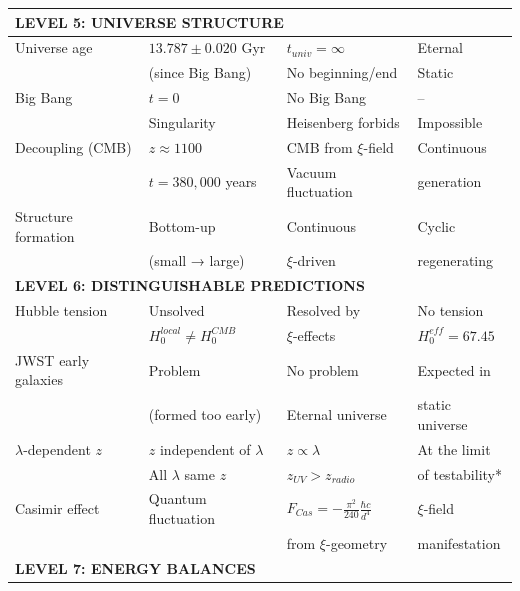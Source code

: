 \documentclass[12pt,a4paper]{report}
\begin{document}
\begin{longtable}{p{4.0cm}p{3.2cm}p{2.8cm}p{2.8cm}}
	\midrule
	\multicolumn{4}{l}{\textbf{LEVEL 5: UNIVERSE STRUCTURE}} \\
	\midrule
	
	Universe age & $13.787 \pm 0.020$ Gyr & $t_{univ} = \infty$ & Eternal \\
	& (since Big Bang) & No beginning/end & Static \\[0.3em]
	
	Big Bang & $t = 0$ & No Big Bang & -- \\
	& Singularity & Heisenberg forbids & Impossible \\[0.3em]
	
	Decoupling (CMB) & $z \approx 1100$ & CMB from $\xi$-field & Continuous \\
	& $t = 380,000$ years & Vacuum fluctuation & generation \\[0.3em]
	
	Structure formation & Bottom-up & Continuous & Cyclic \\
	& (small → large) & $\xi$-driven & regenerating \\[0.3em]
	
	\midrule
	\multicolumn{4}{l}{\textbf{LEVEL 6: DISTINGUISHABLE PREDICTIONS}} \\
	\midrule
	
	Hubble tension & Unsolved & Resolved by & No tension \\
	& $H_0^{local} \neq H_0^{CMB}$ & $\xi$-effects & $H_0^{eff} = 67.45$ \\[0.3em]
	
	JWST early galaxies & Problem & No problem & Expected in \\
	& (formed too early) & Eternal universe & static universe \\[0.3em]
	
	$\lambda$-dependent $z$ & $z$ independent of $\lambda$ & $z \propto \lambda$ & At the limit \\
	& All $\lambda$ same $z$ & $z_{UV} > z_{radio}$ & of testability* \\[0.3em]
	
	Casimir effect & Quantum fluctuation & $F_{Cas} = -\frac{\pi^2}{240} \frac{\hbar c}{d^4}$ & $\xi$-field \\
	& & from $\xi$-geometry & manifestation \\[0.3em]
	
	\midrule
	\multicolumn{4}{l}{\textbf{LEVEL 7: ENERGY BALANCES}} \\
	\midrule
	

\end{longtable}
\end{document}
